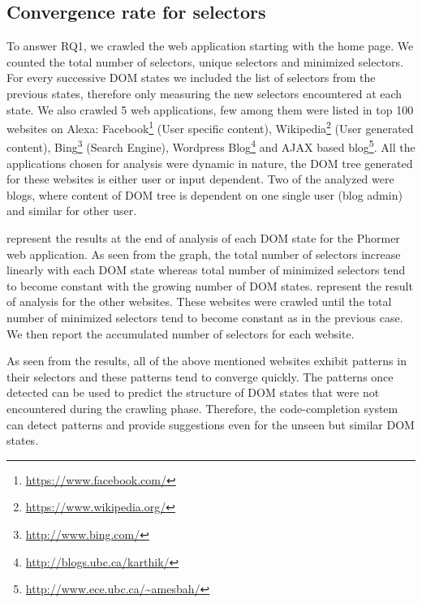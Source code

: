 	\subsection{Convergence rate for \css selectors}
	\label{Sec:Convergence}
	To answer RQ1, we crawled the web application starting with the home page. We counted the total number of \css selectors, unique \css selectors and minimized \css selectors. For every successive DOM states we included the list of \css selectors from the previous states, therefore only measuring the new \css selectors encountered at each state. We also crawled 5 web applications, few among them were listed in top 100 websites on Alexa: Facebook\footnote{\url{https://www.facebook.com/}} (User specific content), Wikipedia\footnote{\url{https://www.wikipedia.org/}} (User generated content), Bing\footnote{\url{http://www.bing.com/}} (Search Engine), Wordpress Blog\footnote{\url{http://blogs.ubc.ca/karthik/}} and AJAX based blog\footnote{\url{http://www.ece.ubc.ca/~amesbah/}}. All the applications chosen for analysis were dynamic in nature, \ie the DOM tree generated for these websites is either user or input dependent. Two of the analyzed were blogs, where content of DOM tree is dependent on one single user (blog admin) and similar for other user. 

	 represent the results at the  end of analysis of each DOM state for the Phormer web application. As seen from the graph, the total number of \css selectors increase linearly with each DOM state whereas total number of minimized \css selectors tend to become constant with the growing number of DOM states.  represent the result of analysis for the other websites. These websites were crawled until the total number of minimized \css selectors tend to become constant as in the previous case. We then report the accumulated number of \css selectors for each website.
	
	As seen from the results, all of the above mentioned websites exhibit patterns in their \css selectors and these patterns tend to converge quickly. The patterns once detected can be used to predict the structure of DOM states that were not encountered during the crawling phase. Therefore, the code-completion system can detect patterns and provide suggestions even for the unseen but similar DOM states.
	
	
